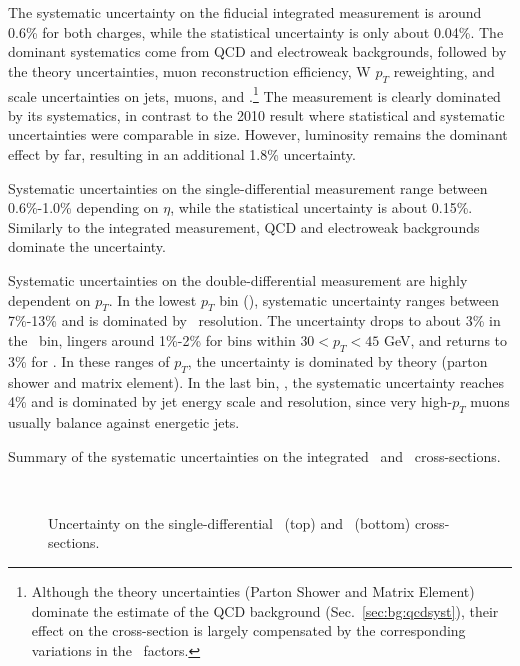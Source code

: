 The systematic uncertainty on the fiducial integrated measurement is around 0.6\% for both charges, while the statistical uncertainty is only about 0.04\%. The dominant systematics come from QCD and electroweak backgrounds, followed by the theory uncertainties, muon reconstruction efficiency, W $p_T$ reweighting, and scale uncertainties on jets, muons, and \MET.\footnote{ Although the theory uncertainties (Parton Shower and Matrix Element) dominate the estimate of the QCD background (Sec.~\ref{sec:bg:qcdsyst}), their effect on the cross-section is largely compensated by the corresponding variations in the \C\ factors.} The measurement is clearly dominated by its systematics, in contrast to the 2010 result where statistical and systematic uncertainties were comparable in size. However, luminosity remains the dominant effect by far, resulting in an additional 1.8\% uncertainty. 

Systematic uncertainties on the single-differential measurement range between 0.6\%-1.0\% depending on $\eta$, while the statistical uncertainty is about 0.15\%. Similarly to the integrated measurement, QCD and electroweak backgrounds dominate the uncertainty.

Systematic uncertainties on the double-differential measurement are highly dependent on $p_T$. In the lowest $p_T$ bin (\ptZero), systematic uncertainty ranges between 7\%-13\% and is dominated by \MET\ resolution. The uncertainty drops to about 3\% in the \ptOne\ bin, lingers around 1\%-2\% for bins within $30<p_T<45$ GeV, and returns to 3\% for \ptFive. In these ranges of $p_T$, the uncertainty is dominated by theory (parton shower and matrix element). In the last bin, \ptSix, the systematic uncertainty reaches 4\% and is dominated by jet energy scale and resolution, since very high-$p_T$ muons usually balance against energetic jets.

\begin{table}
  \small
  \begin{center}
  
    \caption{Summary of the systematic uncertainties on the integrated  \Wmunum\ and \Wmunup\ cross-sections.}
    \label{tab:Wmunu:unfolded_unc_0d_pt25}
  \end{center}
\end{table}

\begin{figure}[phtb]
  \begin{center}
         \\
 \caption{ Uncertainty on the single-differential \Wmunum\ (top) and \Wmunup\ (bottom) cross-sections. }
 \label{fig:Wmunu:unfolded_unc_1d_pt25}
 \end{center}
\end{figure}

